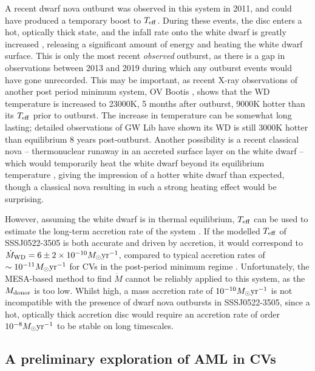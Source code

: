 A recent dwarf nova outburst was observed in this system in 2011, and could have produced a temporary boost to $T_{\rm eff}$. During these events, the disc enters a hot, optically thick state, and the infall rate onto the white dwarf is greatly increased \citep{osaki1996}, releasing a significant amount of energy and heating the white dwarf surface.
This is only the most recent \textit{observed} outburst, as there is a gap in observations between 2013 and 2019 during which any outburst events would have gone unrecorded. This may be important, as recent X-ray observations of another post period minimum system, OV Bootis \citep{Schwope2021}, shows that the WD temperature is increased to 23000K, 5 months after outburst, 9000K hotter than its $T_{\rm eff}$ prior to outburst. The increase in temperature can be somewhat long lasting; detailed observations of GW Lib have shown its WD is still 3000K hotter than equilibrium 8 years post-outburst\citep{Szkody2016}.
Another possibility is a recent classical nova -- thermonuclear runaway in an accreted surface layer on the white dwarf -- which would temporarily heat the white dwarf beyond its equilibrium temperature \citep{starrfield2016}, giving the impression of a hotter white dwarf than expected, though a classical nova resulting in such a strong heating effect would be surprising.

However, assuming the white dwarf is in thermal equilibrium, $T_{\rm eff}$ can be used to estimate the long-term accretion rate of the system \citep{townsley2009}.
If the modelled $T_{\rm eff}$ of SSSJ0522-3505 is both accurate and driven by accretion, it would correspond to $\dot M_{\rm WD} = 6\pm2 \times 10^{-10} M_\odot {\rm yr^{-1}}$, compared to typical accretion rates of $\sim10^{-11} M_\odot {\rm yr^{-1}}$ for CVs in the post-period minimum regime \citep{Pala2017a}. Unfortunately, the MESA-based method to find $\dot M$ cannot be reliably applied to this system, as the $M_{\rm donor}$ is too low.
Whilst high, a mass accretion rate of $10^{-10} M_\odot {\rm yr^{-1}}$ is not incompatible with the presence of dwarf nova outbursts in SSSJ0522-3505, since a hot, optically thick accretion disc would require an accretion rate of order $10^{-8} M_\odot {\rm yr^{-1}}$ \citep{Hameury1998} to be stable on long timescales.



\subsection{A preliminary exploration of AML in CVs}
\label{sect:discussion AML}

